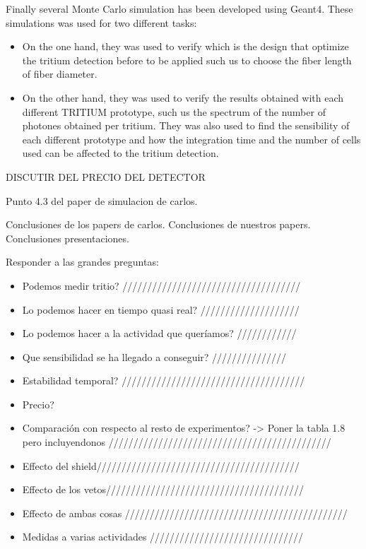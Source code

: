 Finally several Monte Carlo simulation has been developed using Geant4. These simulations was used for two different tasks:

\begin{itemize}

\item{} On the one hand, they was used to verify which is the design that optimize the tritium detection before to be applied such us to choose the fiber length of fiber diameter. 

\item{} On the other hand, they was used to verify the results obtained with each different TRITIUM prototype, such us the spectrum of the number of photones obtained per tritium. They was also used to find the sensibility of each different prototype and how the integration time and the number of cells used can be affected to the tritium detection.

\end{itemize}

DISCUTIR DEL PRECIO DEL DETECTOR







Punto 4.3 del paper de simulacion de carlos.

Conclusiones de los papers de carlos.
Conclusiones de nuestros papers.
Conclusiones presentaciones.

Responder a las grandes preguntas: 
\begin{itemize}
\item{} Podemos medir tritio?  ////////////////////////////////////
\item{} Lo podemos hacer en tiempo quasi real? ////////////////////
\item{} Lo podemos hacer a la actividad que queríamos? ////////////
\item{} Que sensibilidad se ha llegado a conseguir? ///////////////
\item{} Estabilidad temporal? /////////////////////////////////////
\item{} Precio?
\item{} Comparación con respecto al resto de experimentos? -> Poner la tabla 1.8 pero incluyendonos /////////////////////////////////////////////
\item{} Effecto del shield/////////////////////////////////////////
\item{} Effecto de los vetos////////////////////////////////////////
\item{} Effecto de ambas cosas /////////////////////////////////////////////
\item{} Medidas a varias actividades ///////////////////////////////
\end{itemize}
